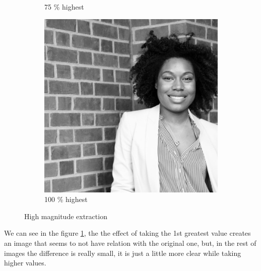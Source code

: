 \begin{figure}[h!]
\begin{subfigure}{0.2\textwidth}
  \caption{75 \% highest}
\end{subfigure}%
\begin{subfigure}{0.2\textwidth}
  \centering
  \includegraphics[width=0.95\linewidth]{output/magnitud_high_100}
  \caption{100 \% highest}
\end{subfigure}%
 \caption{High magnitude extraction}
\label{fig:high-magnitude}
\end{figure}

We can see in the figure \ref{fig:high-magnitude}, the the effect of taking the 1st greatest value creates an image that seems to not have relation with the original one, but, in the rest of images the difference is really small, it is just a little more clear while taking higher values.

